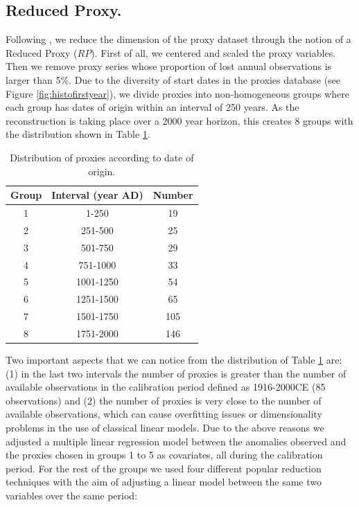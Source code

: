 \documentclass[11pt]{amsart}
\theoremstyle{plain}
\theoremstyle{definition}
\theoremstyle{remark}
\begin{document}
\subsection{Reduced Proxy.}
\label{sec:rp}
Following \cite{Barboza2014}, we reduce the dimension of the proxy dataset
through the notion of a Reduced Proxy ($RP$). First of all, we centered and
scaled the proxy variables. Then we remove proxy series whose proportion of lost
annual 
observations is larger than 5\%. Due to the diversity of start
dates in the proxies database (see Figure \ref{fig:histofirstyear}), we divide
proxies into non-homogeneous groups where each group has dates of origin within an
interval of 250 years. As the reconstruction is taking place over a 2000 year
horizon, this creates 8 groups with the distribution shown in Table \ref{tab:distdate}.
\begin{table}
  \centering
  \begin{tabular}{c|c|c}
    \toprule
    Group & Interval (year AD) & Number \\
    \midrule
    1 & 1-250 & 19 \\
    2 & 251-500 & 25 \\
    3 & 501-750 & 29 \\
    4 & 751-1000 & 33 \\
    5 & 1001-1250 & 54 \\
    6 & 1251-1500 & 65 \\
    7 & 1501-1750 & 105 \\
    8 & 1751-2000 & 146 \\
    \bottomrule
  \end{tabular}
  \caption{Distribution of proxies according to date of origin.}
  \label{tab:distdate}
\end{table}
Two important aspects that we can notice from the distribution of Table
\ref{tab:distdate} are: (1) in the last two intervals the number of proxies is greater than
the number of available observations in the calibration period defined as
1916-2000CE (85 observations) and (2) the number of proxies is very close to the
number of available observations, which can cause overfitting issues or
dimensionality problems in the use of classical linear models. Due to the above
reasons we adjusted a multiple linear regression model between the anomalies
observed and the proxies chosen in groups 1 to 5 as covariates, all during the calibration
period. For the rest of the groups we used four different popular reduction
techniques with the aim of adjusting a linear model between the same two
variables over the same period: 
\end{document}
